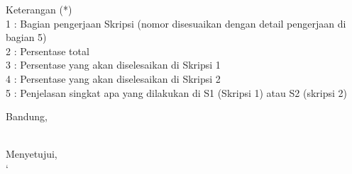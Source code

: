 \documentclass[a4paper,twoside]{article}
\begin{document}
Keterangan (*)\\
1 : Bagian pengerjaan Skripsi (nomor disesuaikan dengan detail pengerjaan di bagian 5)\\
2 : Persentase total \\
3 : Persentase yang akan diselesaikan di Skripsi 1 \\
4 : Persentase yang akan diselesaikan di Skripsi 2 \\
5 : Penjelasan singkat apa yang dilakukan di S1 (Skripsi 1) atau S2 (skripsi 2)

\vspace{1cm}
\centering Bandung, \tanggal\\
\vspace{2cm} \nama \\ 
\vspace{1cm}

Menyetujui, \\
`
\end{document}
